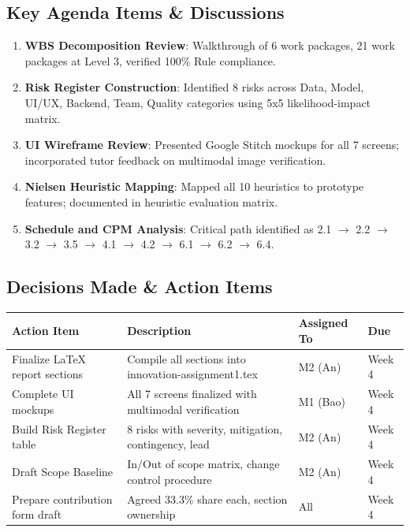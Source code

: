 \documentclass[11pt, a4paper]{article}
\begin{document}
\subsection*{Key Agenda Items \& Discussions}
\begin{enumerate}
  \item \textbf{WBS Decomposition Review}: Walkthrough of 6 work packages, 21 work packages at Level 3, verified 100\% Rule compliance.
  \item \textbf{Risk Register Construction}: Identified 8 risks across Data, Model, UI/UX, Backend, Team, Quality categories using 5x5 likelihood-impact matrix.
  \item \textbf{UI Wireframe Review}: Presented Google Stitch mockups for all 7 screens; incorporated tutor feedback on multimodal image verification.
  \item \textbf{Nielsen Heuristic Mapping}: Mapped all 10 heuristics to prototype features; documented in heuristic evaluation matrix.
  \item \textbf{Schedule and CPM Analysis}: Critical path identified as 2.1 $\to$ 2.2 $\to$ 3.2 $\to$ 3.5 $\to$ 4.1 $\to$ 4.2 $\to$ 6.1 $\to$ 6.2 $\to$ 6.4.
\end{enumerate}

\subsection*{Decisions Made \& Action Items}

\begin{table}[H]
  \centering
  \scriptsize
  \begin{tabularx}{\linewidth}{@{}L{6cm} L{3cm} L{2cm} L{2cm}@{}}
    \toprule
    \textbf{Action Item} & \textbf{Description} & \textbf{Assigned To} & \textbf{Due} \\
    \midrule
    Finalize LaTeX report sections & Compile all sections into innovation-assignment1.tex & M2 (An) & Week 4 \\
    Complete UI mockups & All 7 screens finalized with multimodal verification & M1 (Bao) & Week 4 \\
    Build Risk Register table & 8 risks with severity, mitigation, contingency, lead & M2 (An) & Week 4 \\
    Draft Scope Baseline & In/Out of scope matrix, change control procedure & M2 (An) & Week 4 \\
    Prepare contribution form draft & Agreed 33.3\% share each, section ownership & All & Week 4 \\
    \bottomrule
  \end{tabularx}
\end{table}
\end{document}
